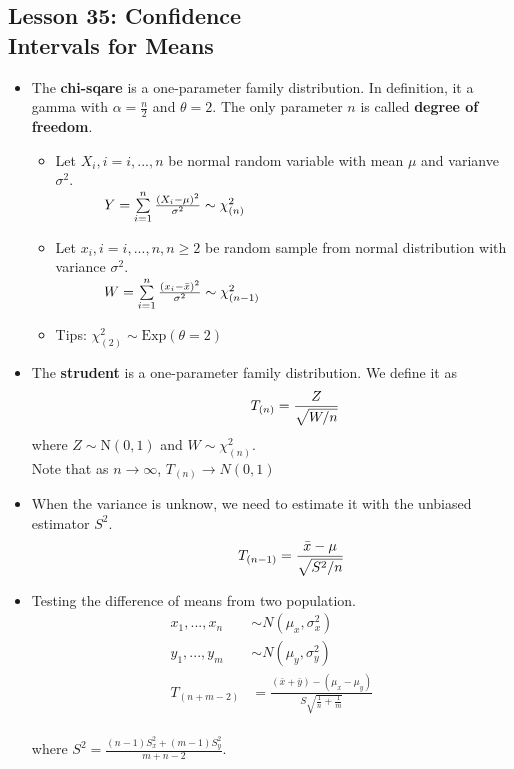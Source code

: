 \documentclass[10pt, french]{article}
\begin{document}
\begin{multicols*}{3}
\section*{Lesson 35: Confidence \\ Intervals for Means}
\begin{itemize}[align=left,leftmargin=*]
  \item The \textbf{chi-sqare} is a one-parameter family distribution. In definition, it a gamma with $\alpha=\frac{n}{2}$ and $\theta=2$. The only parameter $n$ is called \textbf{degree of freedom}.
  \begin{itemize}
    \item Let $X_i, i=i,...,n$ be normal random variable with mean $\mu$ and varianve $\sigma^2$.  \\
    $\hspace*{1.2cm} Y=\sum\limits_{i=1}^n  \frac{(X_i-\mu)^2}{\sigma^2}\sim\chi_{(n)}^2$
    \item Let $x_i, i=i,...,n,n\geq2$ be random sample from normal distribution with variance $\sigma^2$.  \\
    $\hspace*{1.2cm} W=\sum\limits_{i=1}^n  \frac{(x_i-\bar{x})^2}{\sigma^2}\sim\chi_{(n-1)}^2$
    \item Tips: $\chi_{(2)}^2 \sim \mathrm{Exp}(\theta=2)$
  \end{itemize}
  \item The \textbf{strudent} is a one-parameter family distribution. We define it as
  \[\hspace*{1.2cm} T_{(n)} = \frac{Z}{\sqrt{W/n}} \]
  where $Z\sim\mathrm{N}(0,1)$ and $W\sim\chi_{(n)}^2$. \\
  Note that as $n\to\infty$, $T_{(n)}\to N(0,1)$
  \item When the variance is unknow, we need to estimate it with the unbiased estimator $S^2$.
  \[\hspace*{1cm} T_{(n-1)} = \frac{\bar{x}-\mu}{\sqrt{S^2/n}} \]
  \item Testing the difference of means from two population.
  \begin{align*}
    x_1,...,x_n &\sim N(\mu_x,\sigma_x^2) \\
    y_1,...,y_m &\sim N(\mu_y,\sigma_y^2) \\
    T_{(n+m-2)} &= \frac{(\bar{x}+\bar{y})-(\mu_x-\mu_y)}{S\sqrt{\frac{1}{n}+\frac{1}{m}}}
  \end{align*} \\
  where $S^2=\frac{(n-1)S_x^2+(m-1)S_y^2}{m+n-2}.$

\end{itemize}
\end{multicols*}
\end{document}
